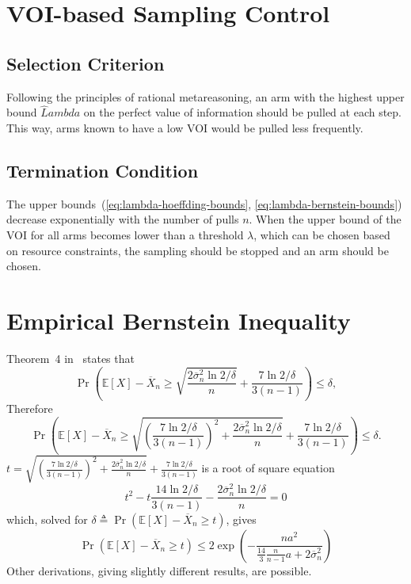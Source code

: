 \documentclass{article}
\newcommand {\IE} {\ensuremath {\mathbb{E}}}
\begin{document}
\section{VOI-based Sampling Control}

\subsection{Selection Criterion}

Following the principles of rational metareasoning, an arm with the highest upper bound $\hat
Lambda$ on the perfect value of information should be pulled at each
step. This way, arms known to have a low VOI  would be pulled less frequently.

\subsection{Termination Condition}

The upper bounds~(\ref{eq:lambda-hoeffding-bounds}, \ref{eq:lambda-bernstein-bounds}) decrease exponentially with the
number of pulls $n$. When the upper bound of the VOI for all arms
becomes lower than a threshold $\lambda$, which can be chosen based on
resource constraints, the sampling should be stopped and an arm should
be chosen.

\appendix

\section{Empirical Bernstein Inequality}
\label{app:deriv-conc-empbernstein}

Theorem~4 in~\cite{MaurerPontil.benrstein} states that
\[\Pr\left(\IE[X]-\overline X_n \ge \sqrt { \frac {2\overline\sigma_n^2 \ln 2/\delta} n } + \frac {7 \ln 2/\delta} {3(n-1)}\right)\le \delta,\]
Therefore
\[\Pr\left(\IE[X]-\overline X_n \ge \sqrt { \left(\frac {7 \ln 2/\delta} {3(n-1)}\right)^2+\frac {2\overline\sigma_n^2 \ln 2/\delta} n } + \frac {7 \ln 2/\delta} {3(n-1)}\right)\le
\delta.\]
$t=\sqrt { \left(\frac {7 \ln 2/\delta} {3(n-1)}\right)^2+\frac {2\overline\sigma_n^2 \ln 2/\delta} n } + \frac {7 \ln 2/\delta} {3(n-1)}$ is a root of
square equation
\[t^2-t\frac {14 \ln 2/\delta} {3(n-1)} -\frac {2\overline\sigma_n^2 \ln 2/\delta} n=0\]
which, solved for $\delta\triangleq\Pr(\IE[X]-\overline X_n\ge t)$,
gives
\[\Pr(\IE[X]-\overline X_n\ge t)\le 2\exp \left( - \frac {na^2} {\frac {14} {3} \frac {n} {n-1}a+2\overline\sigma_n^2}\right)\]
Other derivations, giving slightly different results, are possible.



\end{document}
